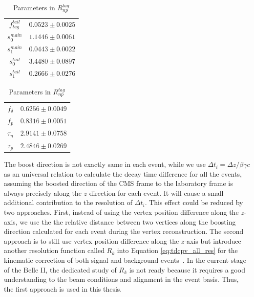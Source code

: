 \begin{table}[H]
	\begin{minipage}[b]{0.5\linewidth}
		\centering
		\caption{Parameters in $R^{tag}_{det}$}
		\label{tab:Rtagdet}
		\begin{tabular}{|c|c|}
			\hline
			$f_{tag}^{tail}$ & $0.0523 \pm 0.0025$\\
			$s_0^{main}$&  $1.1446 \pm 0.0061$ \\
			$s_1^{main}$ & $0.0443\pm 0.0022$\\
			$s_0^{tail}$ &  $3.4480\pm 0.0897$\\
			$s_1^{tail}$  & $0.2666\pm0.0276$ \\
			\hline
		\end{tabular}
	\end{minipage}
	\begin{minipage}[b]{0.5\linewidth}
		\centering
		\caption{Parameters in $R^{tag}_{np}$}
		\label{tab:Rtagnp}
		\begin{tabular}{|c|c|}
			\hline
			$f_{\delta}$ & $0.6256\pm 0.0049$\\
			$f_p$ &  $0.8316 \pm 0.0051$ \\
			$\tau_n$ & $2.9141\pm 0.0758$\\
			$\tau_p$ &  $2.4846\pm 0.0269$\\
			\hline
		\end{tabular}
	\end{minipage}
\end{table}


The boost direction is not exactly same in each event, while we use $\Delta t_i = \Delta z / \beta\gamma c$ as an universal relation to calculate the decay time difference for all the events, assuming the boosted direction of the CMS frame to the laboratory frame is always precisely along the $z$-direction for each event. It will cause a small additional contribution to the resolution of $\Delta t_i$. This effect could be reduced by two approaches. First, instead of using the vertex position difference along the $z$-axis, we use the the relative distance between two vertices along the boosting direction calculated for each event during the vertex reconstruction. The second approach is to still use vertex position difference along the $z$-axis but introduce another resolution function called $R_k$ into Equation \ref{eq:tdcpv_all_res} for the kinematic correction of both signal and background events~\cite{tajima2004proper}. 
In the current stage of the Belle II, the dedicated study of $R_k$ is not ready because it requires a good understanding to the beam conditions and alignment in the event basis. Thus, the first approach is used in this thesis. 



